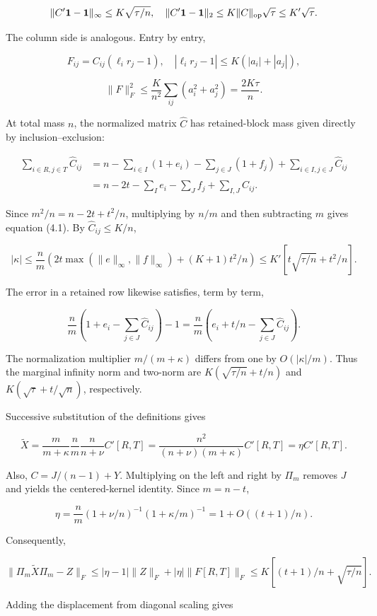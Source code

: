 \documentclass[11pt,a4paper]{article}
\begin{document}
\[
\|C'\mathbf1-\mathbf1\|_\infty\le K\sqrt{\tau/n},\quad
\|C'\mathbf1-\mathbf1\|_2\le K\|C\|_{\rm op}\sqrt\tau\le K'\sqrt\tau.
\]

The column side is analogous. Entry by entry,

\[
F_{ij}=C_{ij}(\ell_ir_j-1),\quad
|\ell_ir_j-1|\le K(|a_i|+|a_j|),
\]

\[
\|F\|_F^2\le\frac K{n^2}\sum_{ij}(a_i^2+a_j^2)
=\frac{2K\tau}n.
\]

At total mass \(n\), the normalized matrix \(\widehat C\) has retained-block mass given directly by inclusion--exclusion:

\[
\begin{aligned}
\sum_{i\in R,j\in T}\widehat C_{ij}
&=n-\sum_{i\in I}(1+e_i)-\sum_{j\in J}(1+f_j)
+\sum_{i\in I,j\in J}\widehat C_{ij}\\
&=n-2t-\sum_Ie_i-\sum_Jf_j+\sum_{I,J}\widehat C_{ij}.
\end{aligned}
\]

Since \(m^2/n=n-2t+t^2/n\), multiplying by \(n/m\) and then subtracting \(m\) gives equation (4.1). By \(\widehat C_{ij}\le K/n\),

\[
|\kappa|\le\frac nm\left(2t\max(\|e\|_\infty,\|f\|_\infty)
+(K+1)t^2/n\right)
\le K'[t\sqrt{\tau/n}+t^2/n].
\]

The error in a retained row likewise satisfies, term by term,

\[
\frac nm\left(1+e_i-\sum_{j\in J}\widehat C_{ij}\right)-1
=\frac nm\left(e_i+t/n-\sum_{j\in J}\widehat C_{ij}\right).
\]

The normalization multiplier \(m/(m+\kappa)\) differs from one by \(O(|\kappa|/m)\). Thus the marginal infinity norm and two-norm are \(K(\sqrt{\tau/n}+t/n)\) and \(K(\sqrt\tau+t/\sqrt n)\), respectively.

Successive substitution of the definitions gives

\[
\widetilde X=\frac m{m+\kappa}\frac nm\frac n{n+\nu}C'[R,T]
=\frac{n^2}{(n+\nu)(m+\kappa)}C'[R,T]=\eta C'[R,T].
\]

Also, \(C=J/(n-1)+Y\). Multiplying on the left and right by \(\Pi_m\) removes \(J\) and yields the centered-kernel identity. Since \(m=n-t\),

\[
\eta=\frac nm(1+\nu/n)^{-1}(1+\kappa/m)^{-1}
=1+O((t+1)/n).
\]

Consequently,

\[
\|\Pi_m\widetilde X\Pi_m-Z\|_F
\le|\eta-1|\|Z\|_F+|\eta|\|F[R,T]\|_F
\le K[(t+1)/n+\sqrt{\tau/n}].
\]

Adding the displacement from diagonal scaling gives
\end{document}

